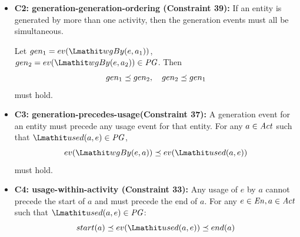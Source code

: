 \begin{itemize}
	
	\item\textbf{C2: generation-generation-ordering (Constraint 39):}  If an entity is generated by more than one activity, then the generation events must all be simultaneous.
	
	Let 
	$gen_1 = ev(\wgby(e, a_1))$, $gen_2 = ev(\wgby(e, a_2)) \in \pg$. Then  \[gen_1  \preceq  gen_2, \quad gen_2 \preceq gen_1\] must hold.
	
	\item\textbf{C3: generation-precedes-usage(Constraint 37):} A generation event for an entity must precede any usage event for that entity.
	For any $a \in \mathit{Act}$ such that $\used(a,e) \in \pg$, \[	ev(\wgby(e, a)) \preorder ev(\used(a,e))\] must hold.
	
	
	
%	
	
	\item\textbf{C4: usage-within-activity (Constraint 33):} Any usage of $e$ by $a$ cannot precede the start of $a$ and must precede the end of $a$. For any $e\in \mathit{En}, a \in \mathit{Act}$ such that $\used(a,e) \in \pg$:
	\[start(a) \preorder ev(\used(a,e))   \preorder end(a)\]
	

\end{itemize}
